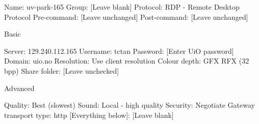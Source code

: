 Name: uv-park-165
Group: [Leave blank]
Protocol: RDP - Remote Desktop Protocol
Pre-command: [Leave unchanged]
Post-command: [Leave unchanged]

Basic

Server: 129.240.112.165
Username: tctan
Password: [Enter UiO password]
Domain: uio.no
Resolution: Use client resolution
Colour depth: GFX RFX (32 bpp)
Share folder: [Leave unchecked]

Advanced

Quality: Best (slowest)
Sound: Local - high quality
Security: Negotiate
Gateway transport type: http
[Everything below]: [Leave blank]